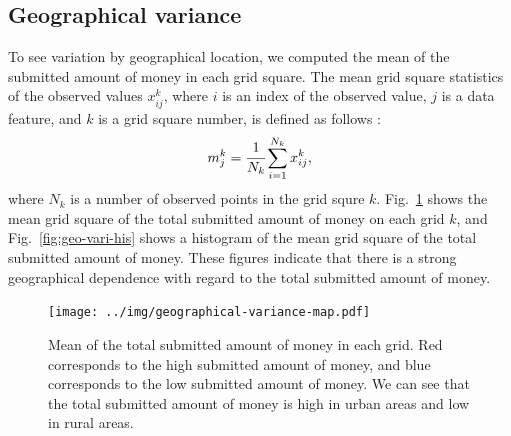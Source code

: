 \documentclass[dvipdfmx, english]{ampmt}             %
\newcommand{\Figref}[1]{Fig.~\ref{#1}}
\begin{document}




\subsection*{Geographical variance}
To see variation by geographical location, we computed the mean of the submitted amount of money in each grid square. The mean grid square statistics of the observed values $x_{ij}^{k}$, where $i$ is an index of the observed value, $j$ is a data feature, and $k$ is a grid square number, is defined as follows : \begin{equation}\label{eq:grid-stat}
m_{j}^{k}= \cfrac{1}{N_k} \sum_{i=1}^{N_{k}}x_{ij}^{k},
\end{equation}
where $N_{k}$ is a number of observed points in the grid squre $k$.
\Figref{fig:geo-vari-map} shows the mean grid square of the total submitted amount of money on each grid $k$, and \Figref{fig:geo-vari-his} shows a histogram of the mean grid square of the total submitted amount of money. These figures indicate that there is a strong geographical dependence with regard to the total submitted amount of money.

\begin{figure}[H]
\centerline{\texttt{[image: ../img/geographical-variance-map.pdf]}}
\caption{Mean of the total submitted amount of money in each grid. Red corresponds to the high submitted amount of money, and blue corresponds to the low submitted amount of money. We can see that the total submitted amount of money is high in urban areas and low in rural areas.}
\label{fig:geo-vari-map}
\end{figure}
\end{document}
